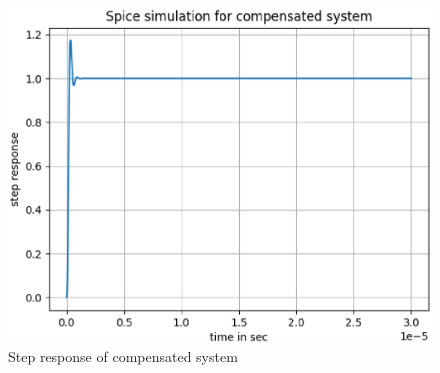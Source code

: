 \begin{enumerate}[label=\thesection.\arabic*.,ref=\thesection.\theenumi]
%
%
\begin{figure}[!h]
	\centering
		\includegraphics[width=\columnwidth]{./figs/ee18btech11029/spicecompensated.eps}
	\caption{Step response of compensated system}
	\label{fig:ee18btech11029_8}
\end{figure}


\end{enumerate}
